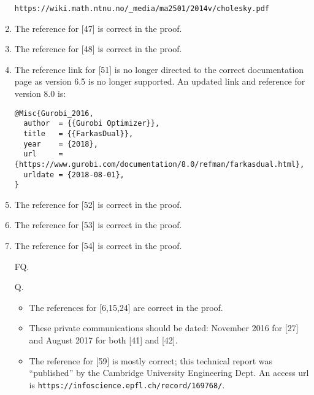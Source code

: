 \documentclass{article}
\begin{document}
\begin{enumerate}
\begin{verbatim}
https://wiki.math.ntnu.no/_media/ma2501/2014v/cholesky.pdf
        \end{verbatim}
        \item The reference for [47] is correct in the proof.
        \item The reference for [48] is correct in the proof.
        \item The reference link for [51] is no longer directed to the correct documentation page as version 6.5 is no longer supported. An updated link and reference for version 8.0 is:
        \begin{verbatim}
@Misc{Gurobi_2016,
  author  = {{Gurobi Optimizer}},
  title   = {{FarkasDual}},
  year    = {2018},
  url     = {https://www.gurobi.com/documentation/8.0/refman/farkasdual.html},
  urldate = {2018-08-01},
}
        \end{verbatim}
        \item The reference for [52] is correct in the proof.
        \item The reference for [53] is correct in the proof.
        \item The reference for [54] is correct in the proof.
        \item[FQ.]
        \item[Q.]
        \begin{itemize}
            \item The references for [6,15,24] are correct in the proof.
            \item These private communications should be dated: November 2016 for [27] and August 2017 for both [41] and [42].
            \item The reference for [59] is mostly correct; this technical report was ``published'' by the Cambridge University Engineering Dept. An access url is \verb|https://infoscience.epfl.ch/record/169768/|.
        \end{itemize}
    \end{enumerate}
\end{document}
